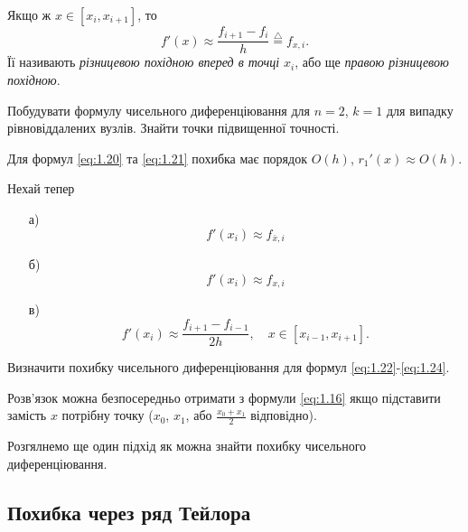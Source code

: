 Якщо ж $x \in [x_i, x_{i+1}]$, то
\begin{equation}
	\label{eq:1.21}
	f'(x) \approx \frac{f_{i + 1} - f_i}{h} \overset{\triangle}{=} f_{x, i}.
\end{equation}
Її називають \textit{різницевою похідною вперед в точці $x_i$}, або ще \textit{правою різницевою похідною}. 

\begin{problem}
	Побудувати формулу чисельного диференціювання для $n = 2$, $k = 1$ для випадку рівновіддалених вузлів. Знайти точки підвищенної точності.
\end{problem}

\begin{remark*}
	Для формул \eqref{eq:1.20} та \eqref{eq:1.21} похибка має порядок $O(h)$, $r_1'(x) \approx O(h)$.
\end{remark*}

\begin{problem}
	Нехай тепер
	\begin{enumerate}
		\item[а)] \begin{equation}
			\label{eq:1.22}
			f'(x_i) \approx f_{\bar x, i}
		\end{equation}
		\item[б)] \begin{equation}
			\label{eq:1.23}
			f'(x_i) \approx f_{x, i}
		\end{equation}
		\item[в)] \begin{equation}
			\label{eq:1.24}
			f'(x_i) \approx \frac{f_{i + 1} - f_{i - 1}}{2 h}, \quad x \in [x_{i - 1}, x_{i + 1}].
		\end{equation}
	\end{enumerate}

	Визначити похибку чисельного диференціювання для формул \eqref{eq:1.22}-\eqref{eq:1.24}.
\end{problem}
\begin{hint}
	Розв'язок можна безпосередньо отримати з формули \eqref{eq:1.16} якщо підставити замість $x$ потрібну точку ($x_0$, $x_1$, або $\frac{x_0+x_1}{2}$ відповідно).
\end{hint}

Розгялнемо ще один підхід як можна знайти похибку чисельного диференціювання.

\subsection{Похибка через ряд Тейлора}

